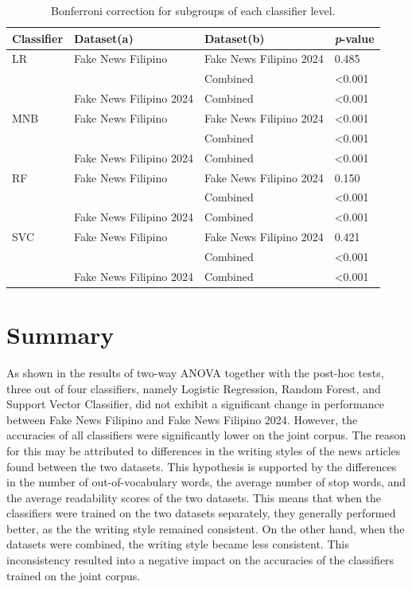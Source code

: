 \begin{table}[ht]
    \centering
    \begin{tabular}{|l|l|l|l|}
        \hline Classifier & Dataset(a) & Dataset(b) & \textit{p}-value \\ \hline
        
        LR & Fake News Filipino & Fake News Filipino 2024 & 0.485 \\
        \cline{3-4}
        & & Combined & \textless 0.001 \\
        \cline{2-4}
        & Fake News Filipino 2024 & Combined & \textless 0.001 \\
        \hline
        MNB & Fake News Filipino & Fake News Filipino 2024 & \textless 0.001 \\
        \cline{3-4}
        & & Combined & \textless 0.001 \\
        \cline{2-4}
        & Fake News Filipino 2024 & Combined & \textless 0.001 \\
        \hline
        RF & Fake News Filipino & Fake News Filipino 2024 & 0.150 \\
        \cline{3-4}
        & & Combined & \textless 0.001 \\
        \cline{2-4}
        & Fake News Filipino 2024 & Combined & \textless 0.001 \\
        \hline
        SVC & Fake News Filipino & Fake News Filipino 2024 & 0.421 \\
        \cline{3-4}
        & & Combined & \textless 0.001 \\
        \cline{2-4}
        & Fake News Filipino 2024 & Combined & \textless 0.001\\
        \hline
    
    \end{tabular}
    \caption{Bonferroni correction for subgroups of each classifier level.}
    \label{tab::post-hoc-classifier-lvl}
\end{table}


\section{Summary} \label{dataset-limitation}

As shown in the results of two-way ANOVA together with the post-hoc tests, three out of four classifiers, namely Logistic Regression, Random Forest, and Support Vector Classifier, did not exhibit a significant change in performance between Fake News Filipino and Fake News Filipino 2024. However, the accuracies of all classifiers were significantly lower on the joint corpus. The reason for this may be attributed to differences in the writing styles of the news articles found between the two datasets. This hypothesis is supported by the differences in the number of out-of-vocabulary words, the average number of stop words, and the average readability scores of the two datasets. This means that when the classifiers were trained on the two datasets separately, they generally performed better, as the the writing style remained consistent. On the other hand, when the datasets were combined, the writing style became less consistent. This inconsistency resulted into a negative impact on the accuracies of the classifiers trained on the joint corpus. 

